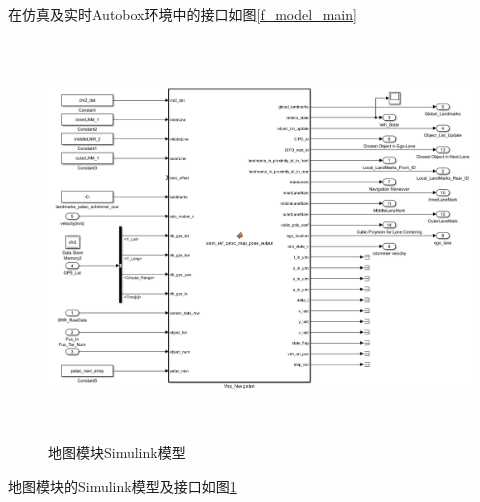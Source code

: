 \documentclass[12pt,a4paper]{article}
\begin{document}
在仿真及实时Autobox环境中的接口如图\ref{f_model_main}
\begin{figure}[!htb]
  \centering
  \includegraphics[height=300pt]{model_mapping.jpg}
  \caption{地图模块Simulink模型\label{f_model_mapping}}
\end{figure}

地图模块的Simulink模型及接口如图\ref{f_model_mapping}
\end{document}
